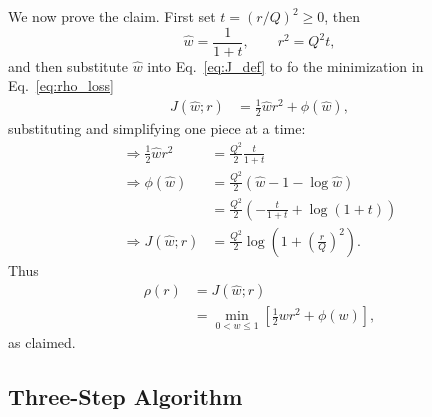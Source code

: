 \documentclass[onecolumn,floatfix]{aastex631}
\begin{document}
We now prove the claim. First set $t = (r/Q)^2 \geq 0$, then
\begin{equation}
    \hat{w} = \frac{1}{1+t}, \qquad r^2 = Q^2 t,
\end{equation}
and then substitute $\hat{w}$ into Eq.~\eqref{eq:J_def} to fo the minimization in Eq.~\eqref{eq:rho_loss}
\begin{align}
    J (\hat{w} ; r) &= \tfrac{1}{2} \hat{w} r^2 + \phi(\hat{w}),
\end{align}
substituting and simplifying one piece at a time:
\begin{align}
    \Rightarrow \tfrac{1}{2} \hat{w} r^2 &= \frac{Q^2}{2} \frac{t}{1 + t} \\
    \Rightarrow \phi(\hat{w}) &= \frac{Q^2}{2} \left( \hat{w} - 1 - \log{\hat{w}} \right) \\
    &= \frac{Q^2}{2} \left( -\frac{t}{1 + t} + \log(1 + t) \right) \\
    \Rightarrow J (\hat{w} ; r) &= \frac{Q^2}{2} \log{\left( 1 + \left( \tfrac{r}{Q}\right)^2 \right)}.
\end{align}
Thus
\begin{align}
    \rho(r) &= J ( \hat{w} ; r ) \\
    &= \min_{0<w\leq1} \left[ \tfrac{1}{2} w r^2 + \phi(w) \right],
\end{align}
as claimed.

\subsection{Three-Step Algorithm}
\end{document}
